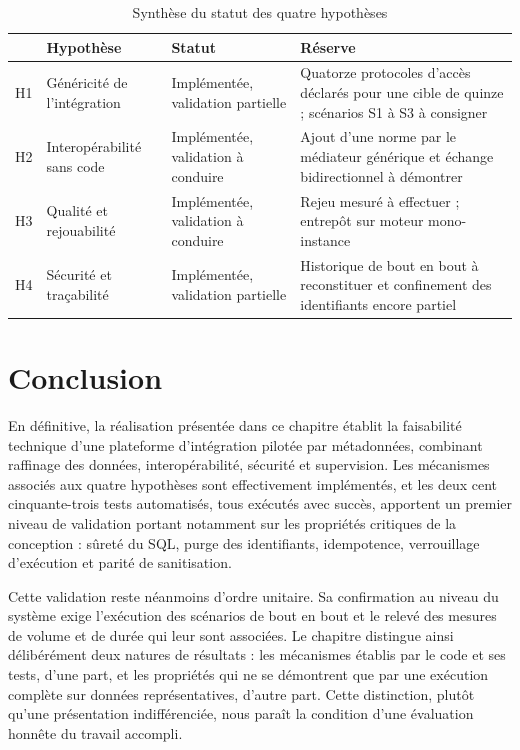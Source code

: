 
\begin{table}[htbp]
\centering
\caption{Synthèse du statut des quatre hypothèses}
\label{tab:synthese-hypotheses}
\small
\begin{tabularx}{\textwidth}{|p{0.8cm}|p{3.6cm}|p{3cm}|X|}
\hline
& \textbf{Hypothèse} & \textbf{Statut} & \textbf{Réserve} \\ \hline

H1 & Généricité de l'intégration & Implémentée, validation partielle & Quatorze
protocoles d'accès déclarés pour une cible de quinze ; scénarios S1 à S3 à
consigner \\ \hline
H2 & Interopérabilité sans code & Implémentée, validation à conduire & Ajout d'une
norme par le médiateur générique et échange bidirectionnel à démontrer \\ \hline
H3 & Qualité et rejouabilité & Implémentée, validation à conduire & Rejeu mesuré à
effectuer ; entrepôt sur moteur mono-instance \\ \hline
H4 & Sécurité et traçabilité & Implémentée, validation partielle & Historique de
bout en bout à reconstituer et confinement des identifiants encore partiel \\ \hline

\end{tabularx}
\end{table}



\section*{Conclusion}

En définitive, la réalisation présentée dans ce chapitre établit la faisabilité
technique d'une plateforme d'intégration pilotée par métadonnées, combinant
raffinage des données, interopérabilité, sécurité et supervision. Les mécanismes
associés aux quatre hypothèses sont effectivement implémentés, et les deux cent
cinquante-trois tests automatisés, tous exécutés avec succès, apportent un premier
niveau de validation portant notamment sur les propriétés critiques de la
conception : sûreté du SQL, purge des identifiants, idempotence, verrouillage
d'exécution et parité de sanitisation.

Cette validation reste néanmoins d'ordre unitaire. Sa confirmation au niveau du
système exige l'exécution des scénarios de bout en bout et le relevé des mesures
de volume et de durée qui leur sont associées. Le chapitre distingue ainsi
délibérément deux natures de résultats : les mécanismes établis par le code et ses
tests, d'une part, et les propriétés qui ne se démontrent que par une exécution
complète sur données représentatives, d'autre part. Cette distinction, plutôt
qu'une présentation indifférenciée, nous paraît la condition d'une évaluation
honnête du travail accompli.
